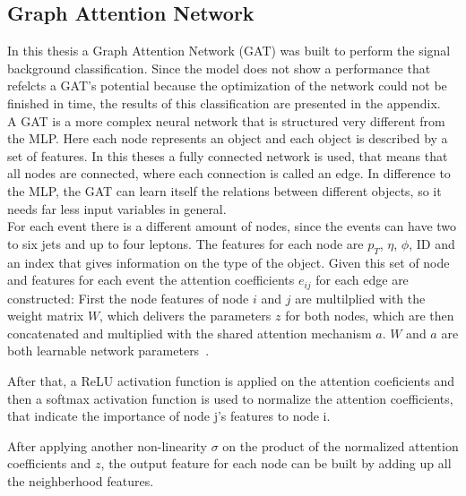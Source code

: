 \label{sec:appendix}

\subsection*{Graph Attention Network}

In this thesis a Graph Attention Network (GAT) was built to perform the signal background classification. Since the model does not show a performance that refelcts a GAT's potential
because the optimization of the network could not be finished in time, the results of this classification are presented in the appendix. \\

A GAT is a more complex neural network that is structured very different from the MLP. Here each node represents an object and each object is described by a set of features. 
In this theses a fully connected network is used, that means that all nodes are connected, where each connection is called an edge.
In difference to the MLP, the GAT can learn itself the relations between different objects, so it needs far less input variables in general. \\

For each event there is a different amount of nodes, since the events can have two to six jets and up to four leptons. The features for each node are $p_T$, $\eta$, $\phi$, ID and an index that gives information on the 
type of the object. Given this set of node and features for each event the attention coefficients $e_{ij}$
for each edge are constructed: First the node features of node $i$ and $j$ are multilplied with the weight matrix $W$, which delivers the parameters $z$ for both nodes, which are then concatenated
and multiplied with the shared attention mechanism $a$. $W$ and $a$ are both learnable network parameters~\cite{GAT:2018}.


After that, a ReLU activation function is applied on the attention coeficients and then a softmax activation function is used to normalize the attention coefficients, that indicate the importance of 
node j's features to node i. 


After applying another non-linearity $\sigma$ on the product of the normalized attention coefficients and $z$, the output feature for each node can be built by adding up all the neighberhood features.

